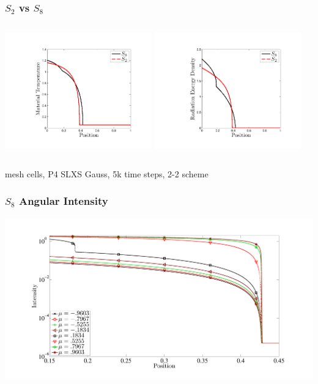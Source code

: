 \documentclass{beamer}
\begin{document}
\begin{frame}
\frametitle{$S_2$ vs $S_8$}
\begin{columns}[t]
\centering
\includegraphics[width=2.5in,trim=1.0in  0.5in 0.2in 0.6in,clip=true]{../chapter6_grey_radtran/S8_vs_S2_Material_Temperature.pdf}
\centering
\includegraphics[width=2.5in,trim=1.0in  0.3in 0.2in 0.5in,clip=true]{../chapter6_grey_radtran/S8_vs_S2_Radiation_Energy_Density.pdf}
\end{columns}
 mesh cells, P4 SLXS Gauss, 5k time steps, 2-2 scheme
\end{frame}

\begin{frame}
\frametitle{$S_8$ Angular Intensity}
\centering
\includegraphics[width=\textwidth,trim=1.5in  0.5in 1.0in 1in,clip=true]{../chapter6_grey_radtran/S8_Intensity_SemiLogy.pdf}
\end{frame}
\end{document}
